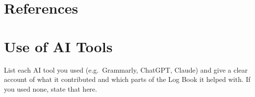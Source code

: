 \documentclass[11pt,a4paper]{article}
\begin{document}
\section*{References}
\printbibliography[heading=none]

\clearpage
\section*{Use of AI Tools}
List each AI tool you used (e.g.\ Grammarly, ChatGPT, Claude) and give a clear account of what it contributed and which parts of the Log Book it helped with. If you used none, state that here.
\end{document}
